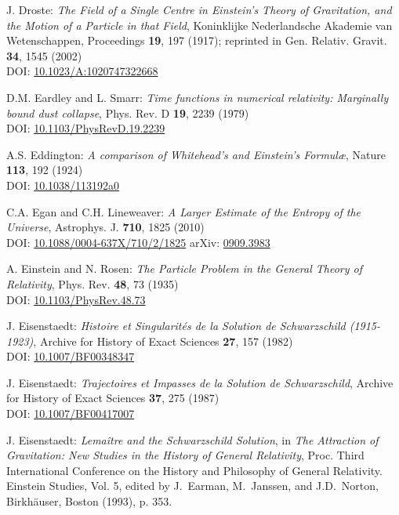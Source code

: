 \begin{thebibliography}{123}
J. Droste:
{\em The Field of a Single Centre in Einstein's Theory of Gravitation, and the Motion of a Particle in that Field},
Koninklijke Nederlandsche Akademie van Wetenschappen, Proceedings {\bf 19}, 197 (1917);
reprinted in Gen. Relativ. Gravit. {\bf 34}, 1545 (2002)\\
DOI: \href{https://doi.org/10.1023/A:1020747322668}{10.1023/A:1020747322668}

D.M. Eardley and L. Smarr:
{\em Time functions in numerical relativity: Marginally bound dust collapse},
Phys. Rev. D {\bf 19}, 2239 (1979)\\
DOI: \href{https://doi.org/10.1103/PhysRevD.19.2239}{10.1103/PhysRevD.19.2239}

A.S. Eddington: {\em A comparison of Whitehead's and Einstein's Formul\ae},
Nature {\bf 113}, 192 (1924) \\
DOI: \href{https://doi.org/10.1038/113192a0}{10.1038/113192a0}

C.A. Egan and C.H. Lineweaver:
{\em A Larger Estimate of the Entropy of the Universe},
Astrophys. J. {\bf 710}, 1825 (2010)\\
DOI: \href{https://doi.org/10.1088/0004-637X/710/2/1825}{10.1088/0004-637X/710/2/1825}\hfill
arXiv: \href{https://arxiv.org/abs/0909.3983}{0909.3983}

A. Einstein and N. Rosen:
{\em The Particle Problem in the General Theory of Relativity},
Phys. Rev. {\bf 48}, 73 (1935) \\
DOI: \href{https://doi.org/10.1103/PhysRev.48.73}{10.1103/PhysRev.48.73}

J. Eisenstaedt:
{\em Histoire et Singularit\'es de la Solution de Schwarzschild (1915-1923)},
Archive for History of Exact Sciences {\bf 27}, 157 (1982) \\
DOI: \href{https://doi.org/10.1007/BF00348347}{10.1007/BF00348347}

J. Eisenstaedt:
{\em Trajectoires et Impasses de la Solution de Schwarzschild},
Archive for History of Exact Sciences {\bf 37}, 275 (1987) \\
DOI: \href{https://doi.org/10.1007/BF00417007}{10.1007/BF00417007}

J. Eisenstaedt: {\em Lemaître and the Schwarzschild Solution}, in
{\em The Attraction of Gravitation: New Studies in the History of
General Relativity}, Proc. Third International Conference on the History and Philosophy of General Relativity. Einstein
Studies, Vol. 5, edited by J.~Earman, M.~Janssen, and J.D.~Norton,
Birkhäuser, Boston (1993), p. 353.


\end{thebibliography}
